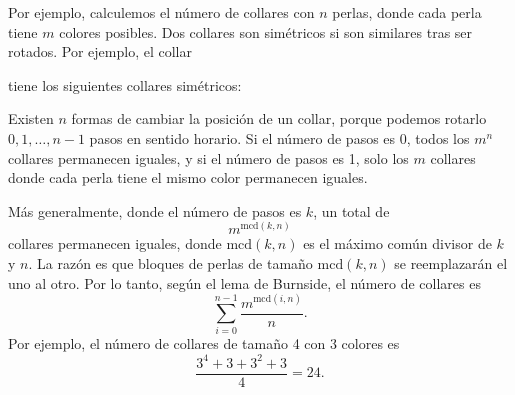 Por ejemplo, calculemos el número de collares con $n$ perlas, donde cada
perla tiene $m$ colores posibles. Dos collares son simétricos si son similares
tras ser rotados. Por ejemplo, el collar
\begin{center}
\end{center}
tiene los siguientes collares simétricos:
\begin{center}
\end{center}
Existen $n$ formas de cambiar la posición de un collar, porque podemos rotarlo
$0,1,\ldots,n-1$ pasos en sentido horario. Si el número de pasos es 0, todos
los $m^n$ collares permanecen iguales, y si el número de pasos es 1, solo los
$m$ collares donde cada perla tiene el mismo color permanecen iguales.

Más generalmente, donde el número de pasos es $k$, un total de
\[m^{\textrm{mcd}(k,n)}\]
collares permanecen iguales, donde $\textrm{mcd}(k,n)$ es el máximo común
divisor de $k$ y $n$. La razón es que bloques de perlas de tamaño
$\textrm{mcd}(k,n)$ se reemplazarán el uno al otro. Por lo tanto, según el
lema de Burnside, el número de collares es
\[\sum_{i=0}^{n-1} \frac{m^{\textrm{mcd}(i,n)}}{n}. \]
Por ejemplo, el número de collares de tamaño 4 con 3 colores es
\[\frac{3^4+3+3^2+3}{4} = 24. \]

